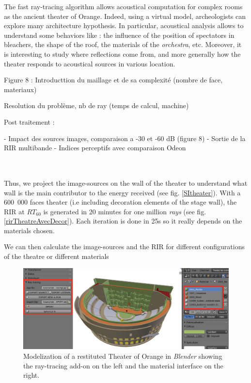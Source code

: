 \documentclass[AMA,STIX1COL]{WileyNJD-v2}
\begin{document}
The fast ray-tracing algorithm allows acoustical computation for complex rooms as the ancient theater of Orange. Indeed, using a virtual model, archeologists can explore many architecture hypothesis. In particular, acoustical analysis allows to understand some behaviors like : the influence of the position of spectators in bleachers, the shape of the roof, the materials of the \textit{orchestra}, etc. Moreover, it is interesting to study where reflections come from, and more generally how the theater responds to acoustical sources in various location.     

Figure 8 : Introducttion du maillage et de sa complexité (nombre de face, materiaux)

Resolution du problème, nb de ray (temps de calcul, machine)

Post traitement : 

 - Impact des sources images, comparaison a -30 et -60 dB (figure 8)
 - Sortie de la RIR multibande
 - Indices perceptifs avec comparaison Odeon

~\\~\\

Thus, we project the image-sources on the wall of the theater to understand what wall is the main contributor to the energy received (see fig. \ref{SItheater}).
With a 600~000 faces theater (i.e including decoration elements of the stage wall), the RIR at $RT_{60}$ is generated in 20 minutes for one million \textit{rays} (see fig. \ref{rirTheatreAvecDecor}). Each iteration is done in 25s so it really depends on the materials chosen. 

We can then calculate the image-sources and the RIR for different configurations of the theatre or different materials

\begin{figure}[t]
\centering
		\includegraphics[width=0.9\linewidth]{soft}
		\caption{Modelization of a restituted Theater of Orange \cite{theseRobin} in \textit{Blender} showing the ray-tracing add-on on the left and the material interface on the right.}
		\label{soft}
\end{figure}
\end{document}

